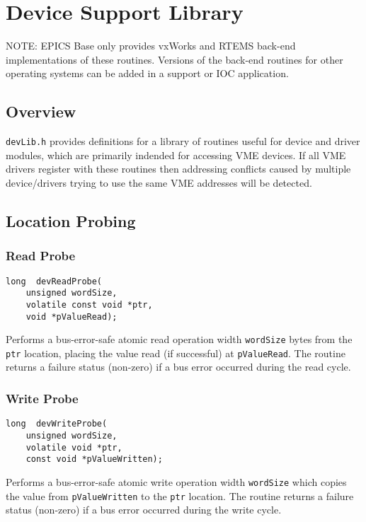 \section{ Device Support Library}

NOTE: EPICS Base only provides vxWorks and RTEMS back-end implementations of these routines. Versions of the 
back-end routines for other operating systems can be added in a support or IOC application.

\subsection{Overview}

\verb|devLib.h| provides definitions for a library of routines useful for device and driver modules, which are primarily 
indended for accessing VME devices. If all VME drivers register with these routines  then  addressing conflicts caused by 
multiple device/drivers trying to use the same VME addresses will be detected.

\subsection{Location Probing}

\subsubsection{Read Probe}

\begin{verbatim}
long  devReadProbe(
    unsigned wordSize,
    volatile const void *ptr,
    void *pValueRead);
\end{verbatim}

Performs a bus-error-safe atomic read operation width \verb|wordSize| bytes from the \verb|ptr| location, placing the value read (if 
successful) at \verb|pValueRead|. The routine returns a failure status (non-zero) if a bus error occurred during the read cycle.

\subsubsection{Write Probe}

\begin{verbatim}
long  devWriteProbe(
    unsigned wordSize,
    volatile void *ptr,
    const void *pValueWritten);
\end{verbatim}

Performs a bus-error-safe atomic write operation width \verb|wordSize| which copies the value from \verb|pValueWritten| to the 
\verb|ptr| location. The routine returns a failure status (non-zero) if a bus error occurred during the write cycle.

